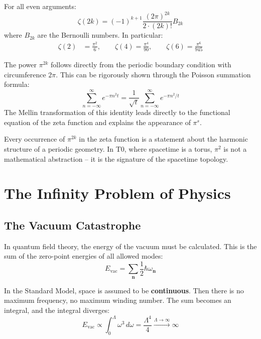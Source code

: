 	\begin{keypoint}
		For all even arguments:
		\begin{equation}
			\zeta(2k) = (-1)^{k+1} \frac{(2\pi)^{2k}}{2 \cdot (2k)!} B_{2k}
			\label{eq:euler-general}
		\end{equation}
		where $B_{2k}$ are the Bernoulli numbers. In particular:
		\begin{align}
			\zeta(2) &= \frac{\pi^2}{6}, \qquad
			\zeta(4) = \frac{\pi^4}{90}, \qquad
			\zeta(6) = \frac{\pi^6}{945}
		\end{align}
	\end{keypoint}
	
	The power $\pi^{2k}$ follows directly from the periodic boundary condition with circumference $2\pi$. This can be rigorously shown through the Poisson summation formula:
	\begin{equation}
		\sum_{n=-\infty}^{\infty} e^{-\pi n^2 t} = \frac{1}{\sqrt{t}} \sum_{n=-\infty}^{\infty} e^{-\pi n^2 / t}
	\end{equation}
	The Mellin transformation of this identity leads directly to the functional equation of the zeta function and explains the appearance of $\pi^s$.
	
	\begin{keypoint}
		Every occurrence of $\pi^{2k}$ in the zeta function is a statement about the harmonic structure of a periodic geometry. In T0, where spacetime is a torus, $\pi^2$ is not a mathematical abstraction -- it is the signature of the spacetime topology.
	\end{keypoint}


	\section{The Infinity Problem of Physics}
	
	\subsection{The Vacuum Catastrophe}
	
	In quantum field theory, the energy of the vacuum must be calculated. This is the sum of the zero-point energies of all allowed modes:
	\begin{equation}
		E_{\text{vac}} = \sum_{\mathbf{n}} \frac{1}{2} \hbar \omega_{\mathbf{n}}
	\end{equation}
	
	In the Standard Model, space is assumed to be \textbf{continuous}. Then there is no maximum frequency, no maximum winding number. The sum becomes an integral, and the integral diverges:
	\begin{equation}
		E_{\text{vac}} \propto \int_0^{\Lambda} \omega^3 \, d\omega = \frac{\Lambda^4}{4} \xrightarrow{\Lambda \to \infty} \infty
	\end{equation}
	
